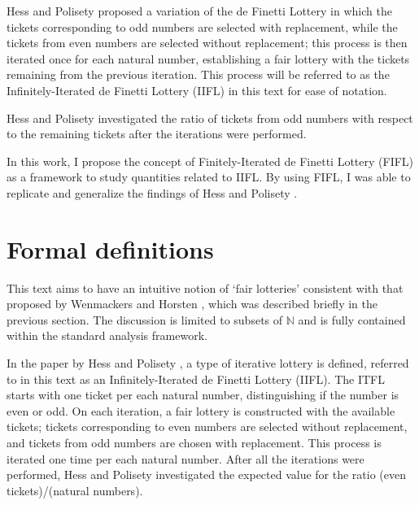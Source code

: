 \documentclass{article}
\newcommand{\N}{\mathbb{N}}
\begin{document}
Hess and Polisety \cite{hess2023} proposed a variation of the de Finetti Lottery in which the tickets corresponding to odd numbers are selected with replacement, while the tickets from even numbers are selected without replacement;
this process is then iterated once for each natural number, establishing a fair lottery with the tickets remaining from the previous iteration.
%
This process will be referred to as the Infinitely-Iterated de Finetti Lottery (IIFL) in this text for ease of notation.

Hess and Polisety \cite{hess2023} investigated the ratio of tickets from odd numbers with respect to the remaining tickets after the iterations were performed.

In this work, I propose the concept of Finitely-Iterated de Finetti Lottery (FIFL) as a framework to study quantities related to IIFL.
%
By using FIFL, I was able to replicate and generalize the findings of Hess and Polisety \cite{hess2023}.


\section{Formal definitions}

This text aims to have an intuitive notion of `fair lotteries' consistent with that proposed by Wenmackers and Horsten \cite{fair_infinite_lottery}, which was described briefly in the previous section.
%
The discussion is limited to subsets of $\N$ and is fully contained within the standard analysis framework.


In the paper by Hess and Polisety \cite{hess2023}, a type of iterative lottery is defined, referred to in this text as an Infinitely-Iterated de Finetti Lottery (IIFL).
%
The ITFL starts with one ticket per each natural number, distinguishing if the number is even or odd.
%
On each iteration, a fair lottery is constructed with the available tickets; tickets corresponding to even numbers are selected without replacement, and tickets from odd numbers are chosen with replacement.
%
This process is iterated one time per each natural number.
%
After all the iterations were performed, Hess and Polisety investigated the expected value for the ratio (even tickets)/(natural numbers).
\end{document}
